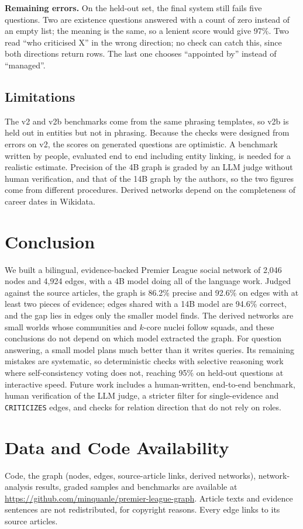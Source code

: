 \documentclass[11pt]{article}
\begin{document}
\textbf{Remaining errors.} On the held-out set, the final system still fails five questions. Two are existence questions answered with a count of zero instead of an empty list; the meaning is the same, so a lenient score would give 97\%. Two read ``who criticised X'' in the wrong direction; no check can catch this, since both directions return rows. The last one chooses ``appointed by'' instead of ``managed''.

\subsection{Limitations}
The v2 and v2b benchmarks come from the same phrasing templates, so v2b is held out in entities but not in phrasing. Because the checks were designed from errors on v2, the scores on generated questions are optimistic. A benchmark written by people, evaluated end to end including entity linking, is needed for a realistic estimate. Precision of the 4B graph is graded by an LLM judge without human verification, and that of the 14B graph by the authors, so the two figures come from different procedures. Derived networks depend on the completeness of career dates in Wikidata.

\section{Conclusion}
We built a bilingual, evidence-backed Premier League social network of 2,046 nodes and 4,924 edges, with a 4B model doing all of the language work. Judged against the source articles, the graph is 86.2\% precise and 92.6\% on edges with at least two pieces of evidence; edges shared with a 14B model are 94.6\% correct, and the gap lies in edges only the smaller model finds. The derived networks are small worlds whose communities and $k$-core nuclei follow squads, and these conclusions do not depend on which model extracted the graph. For question answering, a small model plans much better than it writes queries. Its remaining mistakes are systematic, so deterministic checks with selective reasoning work where self-consistency voting does not, reaching 95\% on held-out questions at interactive speed. Future work includes a human-written, end-to-end benchmark, human verification of the LLM judge, a stricter filter for single-evidence and \texttt{CRITICIZES} edges, and checks for relation direction that do not rely on roles.

\section*{Data and Code Availability}
Code, the graph (nodes, edges, source-article links, derived networks), network-analysis results, graded samples and benchmarks are available at \url{https://github.com/minquanle/premier-league-graph}. Article texts and evidence sentences are not redistributed, for copyright reasons. Every edge links to its source articles.
\end{document}
